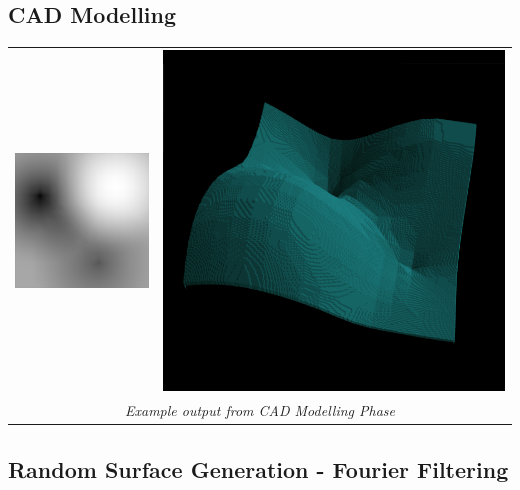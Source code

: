\documentclass[aspectratio=169]{beamer}
\newenvironment{myframe}[1][t]{\begin{frame}[#1]{\secname}{\subsecname}}{\end{frame}}
\begin{document}
	\subsection{CAD Modelling}
	
	\begin{myframe}
		\centering
		\vspace{0.5em}
		\begin{tabular}{rl}
			\includegraphics[width=0.3\linewidth]{images/methodology/base} &	
			\includegraphics[width=0.3\linewidth]{images/methodology/base3d} \\
			\multicolumn{2}{c}{\scriptsize\textit{Example output from CAD Modelling Phase}}		
		\end{tabular}
	\end{myframe}
	
	\subsection{Random Surface Generation - Fourier Filtering}
	
\end{document}
